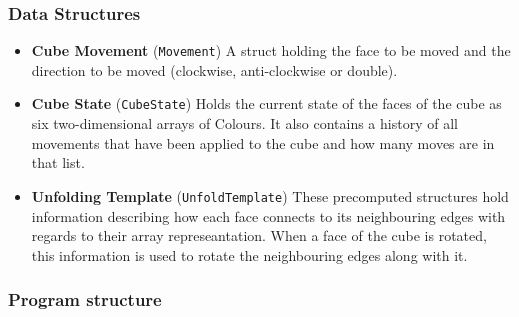 \documentclass[8pt]{article}
\begin{document}
\subsubsection{Data Structures}

\begin{itemize}

    \item \textbf{Cube Movement} (\texttt{Movement}) A struct holding the face to
    be moved and the direction to be moved (clockwise, anti-clockwise or double).

    \item \textbf{Cube State} (\texttt{CubeState}) Holds the current state of the
    faces of the cube as six two-dimensional arrays of Colours. It also contains
    a history of all movements that have been applied to the cube and how many moves
    are in that list.

    \item \textbf{Unfolding Template} (\texttt{UnfoldTemplate}) These precomputed
    structures hold information describing how each face connects to its neighbouring
    edges with regards to their array represeantation. When a face of the cube is rotated, this
    information is used to rotate the neighbouring edges along with it.

\end{itemize}

\subsubsection{Program structure}
\end{document}
